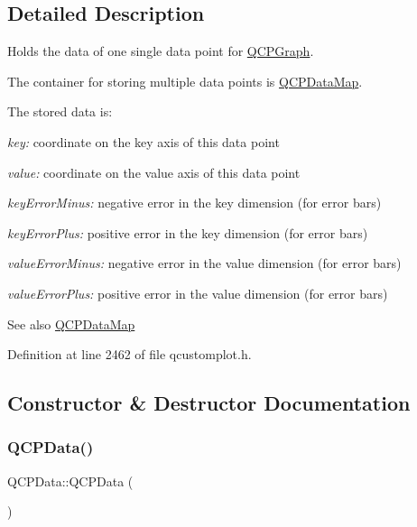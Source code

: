 \subsection{Detailed Description}
Holds the data of one single data point for \hyperlink{class_q_c_p_graph}{Q\+C\+P\+Graph}. 

The container for storing multiple data points is \hyperlink{qcustomplot_8h_a84a9c4a4c2216ccfdcb5f3067cda76e3}{Q\+C\+P\+Data\+Map}.

The stored data is\+: \begin{DoxyItemize}
\item {\itshape key\+:} coordinate on the key axis of this data point \item {\itshape value\+:} coordinate on the value axis of this data point \item {\itshape key\+Error\+Minus\+:} negative error in the key dimension (for error bars) \item {\itshape key\+Error\+Plus\+:} positive error in the key dimension (for error bars) \item {\itshape value\+Error\+Minus\+:} negative error in the value dimension (for error bars) \item {\itshape value\+Error\+Plus\+:} positive error in the value dimension (for error bars)\end{DoxyItemize}
\begin{DoxySeeAlso}{See also}
\hyperlink{qcustomplot_8h_a84a9c4a4c2216ccfdcb5f3067cda76e3}{Q\+C\+P\+Data\+Map} 
\end{DoxySeeAlso}


Definition at line 2462 of file qcustomplot.\+h.



\subsection{Constructor \& Destructor Documentation}
\mbox{\label{class_q_c_p_data_a1f06d624e36ba0ed72ac36d42aa5c7ee}} 
\subsubsection{\texorpdfstring{Q\+C\+P\+Data()}{QCPData()}\hspace{0.1cm}{\footnotesize\ttfamily [1/2]}}
{\footnotesize\ttfamily Q\+C\+P\+Data\+::\+Q\+C\+P\+Data (\begin{DoxyParamCaption}{ }\end{DoxyParamCaption})}


